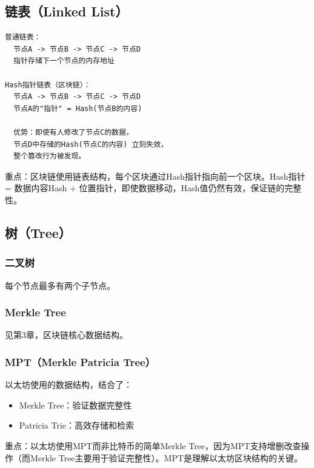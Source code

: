 ﻿\documentclass[12pt,a4paper]{article}
\begin{document}
\subsection{链表（Linked List）}

\begin{lstlisting}
普通链表：
  节点A -> 节点B -> 节点C -> 节点D
  指针存储下一个节点的内存地址

Hash指针链表（区块链）：
  节点A -> 节点B -> 节点C -> 节点D
  节点A的"指针" = Hash(节点B的内容)
  
  优势：即使有人修改了节点C的数据，
  节点D中存储的Hash(节点C的内容) 立刻失效，
  整个篡改行为被发现。
\end{lstlisting}

\begin{keypointbox}
重点：区块链使用链表结构，每个区块通过Hash指针指向前一个区块。Hash指针 = 数据内容Hash + 位置指针，即使数据移动，Hash值仍然有效，保证链的完整性。
\end{keypointbox}

\subsection{树（Tree）}

\subsubsection{二叉树}

每个节点最多有两个子节点。

\subsubsection{Merkle Tree}

见第3章，区块链核心数据结构。

\subsubsection{MPT（Merkle Patricia Tree）}

以太坊使用的数据结构，结合了：
\begin{itemize}[leftmargin=1.5em]
\item Merkle Tree：验证数据完整性
\item Patricia Trie：高效存储和检索
\end{itemize}

\begin{keypointbox}
重点：以太坊使用MPT而非比特币的简单Merkle Tree，因为MPT支持增删改查操作（而Merkle Tree主要用于验证完整性）。MPT是理解以太坊区块结构的关键。
\end{keypointbox}
\end{document}
